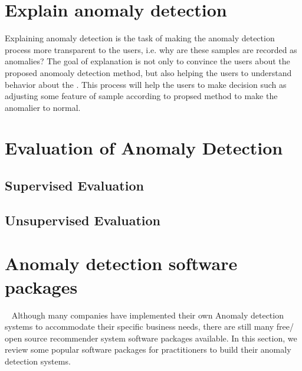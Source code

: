 \section{Explain anomaly detection}
Explaining anomaly detection is the task of making 
the anomaly detection process more transparent to the users,
i.e. why are these samples are recorded as anomalies?  
The  goal of explanation is not only to 
convince the users about the proposed anomoaly detection method,
but also helping the users to understand behavior about
the .
This process will help the users to make decision such as
adjusting some feature of sample according to propsed method to 
make the anomalier to normal.


\section{Evaluation of Anomaly Detection}

\subsection{Supervised Evaluation}

\subsection{Unsupervised Evaluation}

\section{Anomaly detection software packages}~\label{sec:tools}
Although many companies have implemented their own Anomaly detection systems 
to accommodate their specific business needs, 
there are still many free/ open source recommender system
software packages available.
In this section, 
we review some popular software packages for practitioners
to build their anomaly detection systems.

